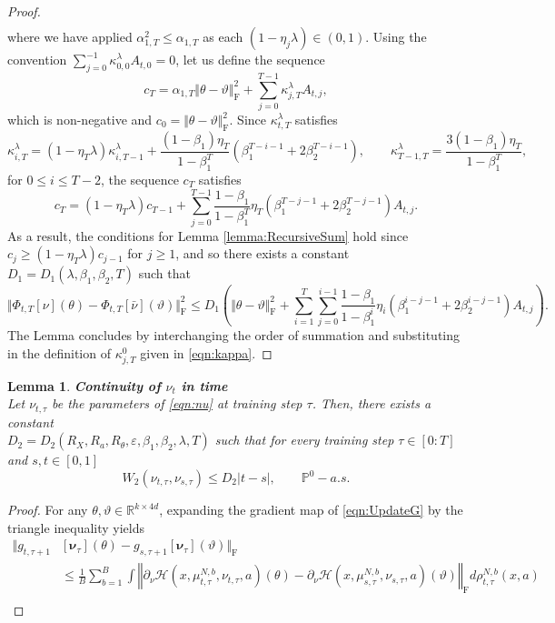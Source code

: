 \documentclass{article}
\newtheorem{lemma}[theorem]{Lemma}
\newcommand{\R}{\mathbb{R}}
\begin{document}
\begin{appendices}
\begin{proof}
\begin{align*}
\end{align*}
 where we have applied $\alpha_{1,T}^2\le \alpha_{1,T}$ as each $(1-\eta_j\lambda)\in(0,1)$. Using the convention $\sum_{j=0}^{-1}\kappa^\lambda_{0,0}A_{t,0}=0$, let us define the sequence
\[
c_T = \alpha_{1,T}\Vert \theta-\vartheta\Vert^2_\mathrm{F}+\sum_{j=0}^{T-1}\kappa^\lambda_{j,T} A_{t,j},
\]
which is non-negative and $c_0=\Vert \theta-\vartheta\Vert_\mathrm{F}^2$. Since $\kappa^\lambda_{t,T}$ satisfies 
\[
\kappa^\lambda_{i,T}=(1-\eta_T\lambda)\kappa^\lambda_{i,T-1}+ \frac{(1-\beta_1)\eta_T}{1-\beta_1^T}(\beta_1^{T-i-1}+2\beta_2^{T-i-1}), \qquad \kappa^\lambda_{T-1,T}=\frac{3(1-\beta_1)\eta_T}{1-\beta_1^T},
\]
for $0\le i \le T-2$, the sequence $c_T$ satisfies
\[
c_T=(1-\eta_{T}\lambda)c_{T-1}+\sum_{j=0}^{T-1}\frac{1-\beta_1}{1-\beta_1^T}\eta_T(\beta_1^{T-j-1}+2\beta_2^{T-j-1}) A_{t,j}.
\]
As a result, the conditions for Lemma \ref{lemma:RecursiveSum} hold since $c_j\ge (1-\eta_T\lambda)c_{j-1}$ for $j\ge 1$, and so there exists a constant $D_1=D_1(\lambda,\beta_1,\beta_2,T)$ such that
\[
\Vert\Phi_{t,T}[\nu](\theta)-\Phi_{t,T}[\bar\nu](\vartheta)\Vert^2_\mathrm{F}\le D_1\left( \Vert \theta-\vartheta\Vert_\mathrm{F}^2+\sum_{i=1}^T\sum_{j=0}^{i-1}\frac{1-\beta_1}{1-\beta_1^i}\eta_i(\beta_1^{i-j-1}+2\beta_2^{i-j-1}) A_{t,j}\right).
\]
The Lemma concludes by interchanging the order of summation and substituting in the definition of $\kappa^{0}_{j,T}$ given in \eqref{eqn:kappa}.
\end{proof}
\begin{lemma}\label{lemma:Lipt}
\textbf{Continuity of $\nu_t$ in time}\\
Let $\nu_{t,\tau}$ be the parameters of \eqref{eqn:nu} at training step $\tau$.
Then, there exists a constant \\$D_2=D_2(R_X,R_a,R_\theta,\varepsilon,\beta_1,\beta_2,\lambda,T)$ such that for every training step $\tau \in[0:T]$ and $s,t\in[0,1]$
\[
 W_2(\nu_{t,\tau}, \nu_{s,\tau})\le D_2|t-s|, \qquad \mathbb P^0-a.s.
\]
\end{lemma}
\begin{proof}
For any $\theta ,\vartheta\in \R^{k\times 4d}$, expanding the gradient map of  \eqref{eqn:UpdateG} by the triangle inequality yields
\begin{align*}
    \Vert g_{t,\tau+1}&[\bm\nu_\tau](\theta)-g_{s,\tau+1}[\bm{\nu}_\tau](\vartheta)\Vert_\mathrm{F} \\
    & \le \frac{1}{B}\sum_{b=1}^B\int \left\Vert \partial_\nu\mathcal H(x,\mu^{N,b}_{t,\tau},\nu_{t,\tau},a)( \theta)-\partial_\nu\mathcal H(x,\mu^{N,b}_{s,\tau},\nu_{s,\tau},a)( \vartheta)\right\Vert_\mathrm{F}d\rho^{N,b}_{t,\tau}(x,a)\\

\end{align*}
\end{proof}
\end{appendices}
\end{document}
